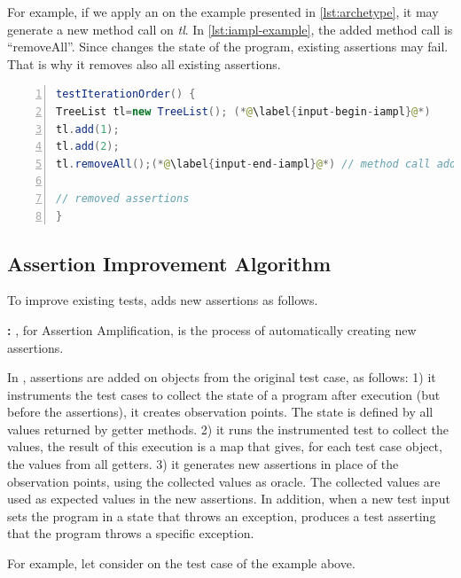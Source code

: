 For example, if we apply an \Iampl on the example presented in \autoref{lst:archetype}, it may generate a new method call on \emph{tl}.
In \autoref{lst:iampl-example}, the added method call is ``removeAll''. Since \dspot changes the state of the program, existing assertions may fail. That is why it removes also all existing assertions.


\begin{lstlisting}[caption={An example of an \Iampl{}: the amplification added a method call to \emph{removeAll()} on \emph{tl}.},label=lst:iampl-example,float,language=java,numbers=left] 
testIterationOrder() {
TreeList tl=new TreeList(); (*@\label{input-begin-iampl}@*)
tl.add(1);
tl.add(2);
tl.removeAll();(*@\label{input-end-iampl}@*) // method call added

// removed assertions
}
\end{lstlisting}

\subsection{Assertion Improvement Algorithm}
\label{subsec:new-assertions}

To improve existing tests, \dspot adds new assertions as follows.

\textbf{\Aampl:} \Aampl, for Assertion Amplification, is the process of automatically creating new assertions.

In \dspot, assertions are added on objects from the original test case, as follows: 
1) it instruments the  test cases to collect the state of a program after execution (but before the assertions), \ie it creates observation points. The state is defined by all values returned by getter methods.
2) it runs the instrumented test to collect the values,
the result of this execution is a map that gives, for each test case object, the values from all getters.
3) it generates new assertions in place of the observation points, using the collected values as oracle. The collected values are used as expected values in the new assertions.
In addition, when a new test input sets the program in a state that throws an exception,  \dspot produces a test asserting that the program throws a specific exception.

For example, let consider \Aampl{} on the test case of the example above. 

